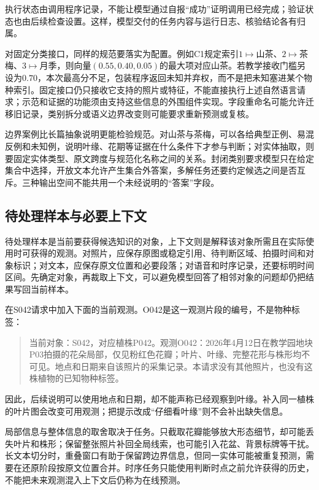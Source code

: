执行状态由调用程序记录，不能让模型通过自报“成功”证明调用已经完成；验证状态也由后续检查设置。这样，模型交付的任务内容与运行日志、核验结论各有归属。

对固定分类接口，同样的规范要落实为配置。例如C1规定索引$1\mapsto$山茶、$2\mapsto$茶梅、$3\mapsto$月季，则向量$(0.55,0.40,0.05)$的最大项对应山茶。若教学接收门槛另设为$0.70$，本次最高分不足，包装程序返回未知并弃权，而不是把未知塞进某个物种索引。固定接口仍只接收它支持的照片或特征，不能直接执行上述自然语言请求；示范和证据的功能须由支持这些信息的外围组件实现。字段重命名可能允许迁移旧记录，类别拆分或语义边界改变则可能要求重新预测或复核。

边界案例比长篇抽象说明更能检验规范。对山茶与茶梅，可以各给典型正例、易混反例和未知例，说明叶缘、花期等证据在什么条件下才参与判断；对实体抽取，则要固定实体类型、原文跨度与规范化名称之间的关系。封闭类别要求模型只在给定集合中选择，开放文本允许产生集合外答案，多解任务还要约定候选之间是否互斥。三种输出空间不能共用一个未经说明的“答案”字段。

\subsection{待处理样本与必要上下文}
\label{sec:knowledge-acquisition-sample-context}

待处理样本是当前要获得候选知识的对象，上下文则是解释该对象所需且在实际使用时可获得的观测。对照片，应保存原图或稳定引用、待判断区域、拍摄时间和对象标识；对文本，应保存原文位置和必要段落；对语音和时序记录，还要标明时间区间。先确定对象，再裁取上下文，可以避免模型回答了相邻对象的问题却仍把结果写回当前样本。

在S042请求中加入下面的当前观测。O042是这一观测片段的编号，不是物种标签：

\begin{quote}
  当前对象：S042，对应植株P042。观测O042：2026年4月12日在教学园地块P03拍摄的花朵局部，仅见粉红色花瓣；叶片、叶缘、完整花形与株形均不可见。地点和日期来自该照片的采集记录。本请求没有其他照片，也没有这株植物的已知物种标签。
\end{quote}

因此，后续说明可以使用地点和日期，却不能声称已经观察到叶缘。补入同一植株的叶片图会改变可用观测；把提示改成“仔细看叶缘”则不会补出缺失信息。

局部信息与整体信息的取舍取决于任务。只截取花瓣能够放大形态细节，却可能丢失叶片和株形；保留整张照片补回全局线索，也可能引入花盆、背景标牌等干扰。长文本切分时，重叠窗口有助于保留跨边界信息，但同一实体可能被重复预测，需要在还原阶段按原文位置合并。时序任务只能使用判断时点之前允许获得的历史，不能把未来观测混入上下文后仍称为在线预测。

